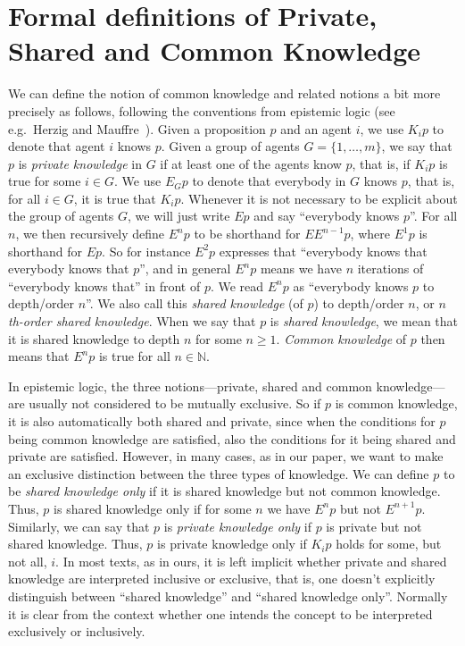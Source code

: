 \documentclass[a4paper,superscriptaddress,nofootinbib]{revtex4}
\begin{document}
\section*{Formal definitions of Private, Shared and Common Knowledge}
\label{A:definitions}
We can define the notion of common knowledge and related notions a bit more precisely as follows, following the conventions from epistemic logic (see e.g.\ Herzig and Mauffre~\cite{herzig2015share}). Given a proposition $p$ and an agent $i$, we use $K_i p$ to denote that agent $i$ knows $p$. Given a group of agents $G = \{1,\dots,m\}$, we say that $p$ is \emph{private knowledge} in $G$ if at least one of the agents know $p$, that is, if $K_i p$ is true for some $i \in G$. We use $E_G p$ to denote that everybody in $G$ knows $p$, that is, for all $i \in G$, it is true that $K_i p$. Whenever it is not necessary to be explicit about the group of agents $G$, we will just write $E p$ and say ``everybody knows $p$''. For all $n$, we then recursively define $E^n p$ to be shorthand for $E E^{n-1} p$, where $E^1 p$ is shorthand for $E p$. So for instance $E^2 p$ expresses that ``everybody knows that everybody knows that $p$'', and in general $E^n p$ means we have $n$ iterations of ``everybody knows that'' in front of $p$. We read $E^n p$ as ``everybody knows $p$ to depth/order $n$''. We also call this \emph{shared knowledge} (of $p$) to depth/order $n$, or \emph{$n$th-order shared knowledge}. When we say that $p$ is \emph{shared knowledge}, we mean that it is shared knowledge to depth $n$ for some $n \geq 1$. \emph{Common knowledge} of $p$ then means that $E^n p$ is true for all $n \in \mathbb{N}$.

In epistemic logic, the three notions---private, shared and common knowledge---are usually not considered to be mutually exclusive. So if $p$ is common knowledge, it is also automatically both shared and private, since when the conditions for $p$ being common knowledge are satisfied, also the conditions for it being shared and private are satisfied. However, in many cases, as in our paper, we want to make an exclusive distinction between the three types of knowledge. We can define $p$ to be \emph{shared knowledge only} if it is shared knowledge but not common knowledge. Thus, $p$ is shared knowledge only if for some $n$ we have $E^n p$ but not $E^{n+1} p$. Similarly, we can say that $p$ is \emph{private knowledge only} if $p$ is private but not shared knowledge. Thus, $p$ is private knowledge only if $K_i p$ holds for some, but not all, $i$. In most texts, as in ours, it is left implicit whether private and shared knowledge are interpreted inclusive or exclusive, that is, one doesn't explicitly distinguish between ``shared knowledge'' and ``shared knowledge only''. Normally it is clear from the context whether one intends the concept to be interpreted exclusively or inclusively. 
\end{document}
